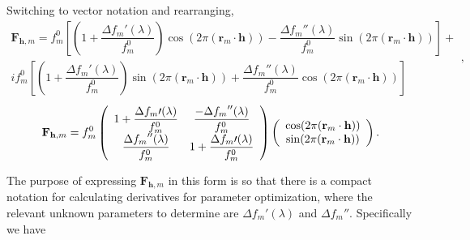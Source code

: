 \documentclass[12pt, letterpaper]{article}
\begin{document}
  Switching to vector notation and rearranging,
   \begin{equation}
    \begin{array}{c}\mathbf{F}_{\mathbf{h},m} =  f^0_m [(1 + \dfrac{\Delta{f_m}\prime(\lambda)}{f^0_m}) \cos(2\pi(\mathbf{r}_m\cdot\mathbf{h})) - 
    \dfrac{\Delta{{f_m}''}(\lambda)}{f^0_m}\sin(2\pi(\mathbf{r}_m\cdot\mathbf{h})) ]+ \\
    if^0_m[ (1 + \dfrac{\Delta{f_m}\prime(\lambda)}{f^0_m})\sin(2\pi(\mathbf{r}_m\cdot\mathbf{h})) +
    \dfrac{\Delta{{f_m}''}(\lambda)}{f^0_m}\cos(2\pi(\mathbf{r}_m\cdot\mathbf{h})) ]

    \end{array}
    \text{,}
    \label{eqn:vecvecF}
  \end{equation}
    \begin{equation}
    \mathbf{F}_{\mathbf{h},m} =  f^0_m 
    \left(\begin{array} {c c} 
    1 + \dfrac{\Delta{f_m}\prime(\lambda)}{f^0_m}  & 
    \dfrac{-\Delta{{f_m}''}(\lambda)}{f^0_m} \\
     \dfrac{\Delta{{f_m}''}(\lambda)}{f^0_m} & 1 + \dfrac{\Delta{f_m}\prime(\lambda)}{f^0_m}
    \end{array}\right)
    \left(
    \begin{array}{c}
    \cos(2\pi(\mathbf{r}_m\cdot\mathbf{h})) \\
    \sin(2\pi(\mathbf{r}_m\cdot\mathbf{h}))
    \end{array}\right)
    \text{.}
    \label{eqn:matvecF}
  \end{equation}
    
  The purpose of expressing $\mathbf{F}_{\mathbf{h},m}$ in this form is so that there is a compact 
  notation for calculating derivatives for parameter optimization, where the relevant unknown parameters to
  determine are $\Delta{f_m}\prime(\lambda)$ and $\Delta{{f_m}''}$.  Specifically we have 
  
\end{document}
